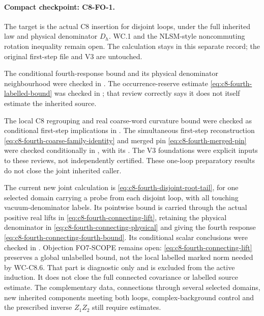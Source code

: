 \documentclass[11pt]{article}
\begin{document}
\paragraph{Compact checkpoint: C8-FO-1.}
The target is the actual C8 insertion for disjoint loops, under
the full inherited law and physical denominator $D_h$.
WC.1 and the NLSM-style noncommuting rotation inequality remain
open. The calculation stays in this separate record; the
original first-step file and V3 are untouched.

The conditional fourth-response bound and its physical
denominator neighbourhood were checked in
. The occurrence-reserve estimate
\eqref{eq:c8-fourth-labelled-bound} was checked in
; that review correctly says it
does not itself estimate the inherited source.

The local C8 regrouping and real coarse-word curvature bound
were checked as conditional first-step implications in
. The simultaneous first-step
reconstruction \eqref{eq:c8-fourth-coarse-family-identity}
and merged pin \eqref{eq:c8-fourth-merged-pin} were checked
conditionally in , with its
. The V3 foundations
were explicit inputs to these reviews, not independently
certified. These one-loop preparatory results do not close
the joint inherited caller.

The current new joint calculation is
\eqref{eq:c8-fourth-disjoint-root-tail}, for one selected domain
carrying a probe from each disjoint loop, with all touching
vacuum-denominator labels. Its pointwise bound is carried
through the actual positive real lifts in
\eqref{eq:c8-fourth-connecting-lift}, retaining the physical
denominator in \eqref{eq:c8-fourth-connecting-physical} and
giving the fourth response
\eqref{eq:c8-fourth-connecting-fourth-bound}.
Its conditional scalar conclusions were checked in
. Objection FO7-SCOPE remains
open: \eqref{eq:c8-fourth-connecting-lift} preserves a global
unlabelled bound, not the local labelled marked norm needed
by WC-C8.6. That part is diagnostic only and is excluded
from the active induction. It does not close the full
connected covariance or labelled source estimate.
The complementary data, connections through several selected
domains, new inherited components meeting both loops,
complex-background control and the prescribed inverse
$Z_1Z_2$ still require estimates.
\end{document}
